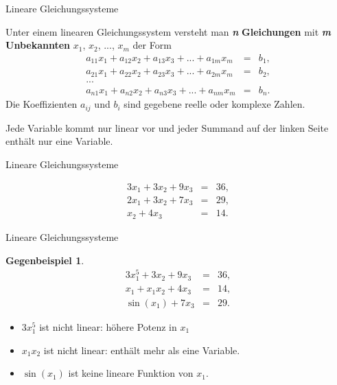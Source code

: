 \documentclass[german]{beamer}
\newcommand{\bq}{\begin{eqnarray*}}
\newcommand{\eq}{\end{eqnarray*}}
\newtheorem*{mytheorem11a}{Gegenbeispiel}
\begin{document}
\begin{frame}{Lineare Gleichungssysteme}

\begin{definition}
Unter einem linearen Gleichungssystem versteht man \textbf{\emph{n}} {\bf Gleichungen} mit \textbf{\emph{m}} {\bf Unbekannten}
$x_1$, $x_2$, ..., $x_m$ der Form
\bq
 a_{11} x_1 + a_{12} x_2 + a_{13} x_3 + ... + a_{1m} x_m & = & b_1,
\nonumber \\
 a_{21} x_1 + a_{22} x_2 + a_{23} x_3 + ... + a_{2m} x_m & = & b_2,
\nonumber \\
 ... & & 
\nonumber \\
 a_{n1} x_1 + a_{n2} x_2 + a_{n3} x_3 + ... + a_{nm} x_m & = & b_n.
\eq
Die Koeffizienten $a_{ij}$ und $b_{i}$ sind gegebene reelle oder komplexe Zahlen.
\end{definition}

Jede Variable kommt nur linear vor und jeder Summand auf der linken Seite enth\"alt nur eine Variable.

\end{frame}

\begin{frame}{Lineare Gleichungssysteme}

\begin{example}
\bq
 3 x_1 + 3 x_2 + 9 x_3 & = & 36,
 \nonumber \\
 2 x_1 + 3 x_2 + 7 x_3 & = & 29,
 \nonumber \\
 x_2 + 4 x_3 & = & 14.
\eq
\end{example}

\end{frame}

\begin{frame}{Lineare Gleichungssysteme}

\begin{mytheorem11a}
\bq
 3 x_1^5 + 3 x_2 + 9 x_3 & = & 36,
 \nonumber \\
 x_1+ x_1 x_2 + 4 x_3 & = & 14,
 \nonumber \\
 \sin\left(x_1\right) + 7 x_3 & = & 29.
\eq
\end{mytheorem11a}

\begin{itemize}
\item $3 x_1^5$ ist nicht linear: h\"ohere Potenz in $x_1$
\item $x_1 x_2$ ist nicht linear: enth\"alt mehr als eine Variable.
\item $\sin(x_1)$ ist keine lineare Funktion von $x_1$.
\end{itemize}
\end{frame}
\end{document}
